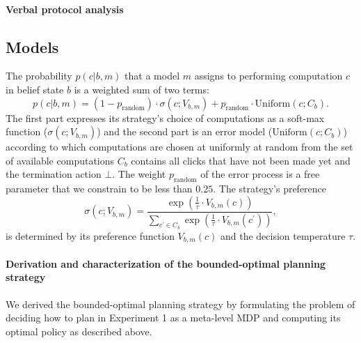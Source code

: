 \paragraph{Verbal protocol analysis}

\subsection{Models}

The probability $p(c|b,m)$ that a model $m$ assigns to performing computation $c$ in belief state $b$ is a weighted sum of two terms: 
\begin{dmath}
    p(c|b,m)=(1-p_{\text{random}})\cdot \sigma(c; V_{b,m}) + p_{\text{random}}\cdot \text{Uniform}(c; C_b).
\end{dmath}
The first part expresses its strategy's choice of computations as a soft-max function ($\sigma(c; V_{b,m})$) and the second part is an error model ($\text{Uniform}(c; C_b)$) according to which computations are chosen at uniformly at random from the set of available computations $C_b$ contains all clicks that have not been made yet and the termination action $\bot$. The weight $p_{\text{random}}$ of the error process is a free parameter that we constrain to be less than $0.25$. The strategy's preference 
\begin{equation}
\sigma(c; V_{b,m}) = \frac{ \exp( \frac{1}{\tau}\cdot V_{b,m}(c)) }{\sum_{c^\prime \in C_b} \exp( \frac{1}{\tau}\cdot V_{b,m}(c^\prime))},\label{eq:softMax}
\end{equation}
is determined by its preference function $V_{b,m}(c)$ and the decision temperature $\tau$.

\paragraph{Derivation and characterization of the bounded-optimal planning strategy}
We derived the bounded-optimal planning strategy by formulating the problem of deciding how to plan in Experiment 1 as a meta-level MDP and computing its optimal policy as described above.

